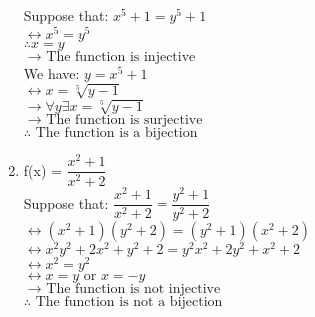 \documentclass[10pt]{article}
\begin{document}
\begin{enumerate}
Suppose that: $x^5 + 1 = y^5 + 1$\\
$\leftrightarrow{x^5 = y^5}$\\
$\therefore{x = y}$\\
$\rightarrow{\mbox{ The function is injective }}$\\
We have: $y = x^5 + 1$\\
$\leftrightarrow{x = \sqrt[5]{y - 1}}$\\
$\rightarrow \forall y \exists x = \sqrt[5]{y - 1}$\\
$\rightarrow{\mbox{ The function is surjective }}$\\
$\therefore{\mbox{ The function is a bijection }}$\\ 
\item f(x) = $\dfrac{x^{2} +1}{x^{2} +2}$\\
Suppose that: $\dfrac{x^{2} +1}{x^{2} +2} = \dfrac{y^{2} +1}{y^{2} +2}$\\
$\leftrightarrow{(x^2 + 1)(y^2 +2) = (y^2 + 1)(x^2 + 2)}$\\
 $\leftrightarrow{x^2y^2 + 2x^2 + y^2 + 2 = y^2x^2 + 2y^2 + x^2 + 2}$\\
  $\leftrightarrow{x^2 = y^2}$\\
  $\leftrightarrow{x = y \mbox{ or } x = - y}$\\
$\rightarrow{\mbox{ The function is not injective }}$\\
$\therefore{\mbox{ The function is not a bijection }}$\\     
\end{enumerate}
\end{document}
